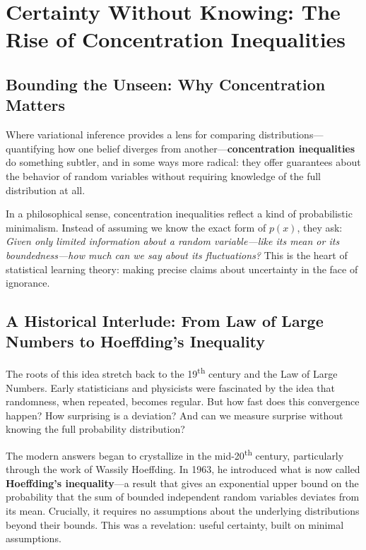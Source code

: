 \section{Certainty Without Knowing: The Rise of Concentration Inequalities}

\subsection{Bounding the Unseen: Why Concentration Matters}

Where variational inference provides a lens for comparing distributions—quantifying how one belief diverges from another—\textbf{concentration inequalities} do something subtler, and in some ways more radical: they offer guarantees about the behavior of random variables without requiring knowledge of the full distribution at all.

In a philosophical sense, concentration inequalities reflect a kind of probabilistic minimalism. Instead of assuming we know the exact form of \( p(x) \), they ask: \emph{Given only limited information about a random variable—like its mean or its boundedness—how much can we say about its fluctuations?} This is the heart of statistical learning theory: making precise claims about uncertainty in the face of ignorance.

\subsection{A Historical Interlude: From Law of Large Numbers to Hoeffding's Inequality}

The roots of this idea stretch back to the 19\textsuperscript{th} century and the Law of Large Numbers. Early statisticians and physicists were fascinated by the idea that randomness, when repeated, becomes regular. But how fast does this convergence happen? How surprising is a deviation? And can we measure surprise without knowing the full probability distribution?

The modern answers began to crystallize in the mid-20\textsuperscript{th} century, particularly through the work of Wassily Hoeffding. In 1963, he introduced what is now called \textbf{Hoeffding’s inequality}—a result that gives an exponential upper bound on the probability that the sum of bounded independent random variables deviates from its mean. Crucially, it requires no assumptions about the underlying distributions beyond their bounds. This was a revelation: useful certainty, built on minimal assumptions.

